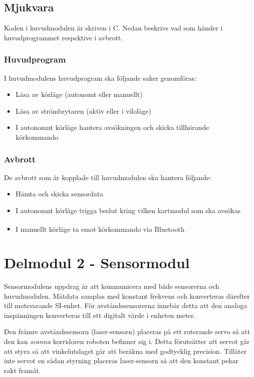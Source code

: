 \documentclass[11pt]{article}
\begin{document}
\begin{flushleft}
\subsection{Mjukvara}
Koden i huvudmodulen är skriven i C. Nedan beskrivs vad som händer i huvudprogrammet respektive i avbrott.

\subsubsection{Huvudprogram}
I huvudmodulens huvudprogram ska följande saker genomföras:

\begin{itemize}
	\item Läsa av körläge (autonomt eller manuellt)
	\item Läsa av strömbrytaren (aktiv eller i viloläge)
	\item I autonomnt körläge hantera avsökningen och skicka tillhörande körkommando
\end{itemize}

\subsubsection{Avbrott}
De avbrott som är kopplade till huvudmodulen ska hantera följande:

\begin{itemize}
	\item Hämta och skicka sensordata
	\item I autonomnt körläge trigga beslut kring vilken kartmodul som ska avsökas
	\item I manuellt körläge ta emot körkommando via Bluetooth\textsuperscript{\circledR}
\end{itemize}

\pagebreak
\section{Delmodul 2 - Sensormodul}
Sensormodulens uppdrag är att kommunicera med både sensorerna och huvudmodulen. Mätdata samplas med konstant frekvens och konverteras därefter till motsvarande SI-enhet. För avståndssensorerna innebär detta att den analoga inspänningen konverteras till ett digitalt värde i enheten meter.

Den främre avståndssensorn (laser-sensorn) placeras på ett roterande servo så att den kan \emph{scanna} korridoren roboten befinner sig i. Detta förutsätter att servot går att styra så att vinkelutslaget går att beräkna med godtycklig precision. Tillåter inte servot en sådan styrning placeras laser-sensorn så att den konstant pekar rakt framåt.


\end{flushleft}
\end{document}
